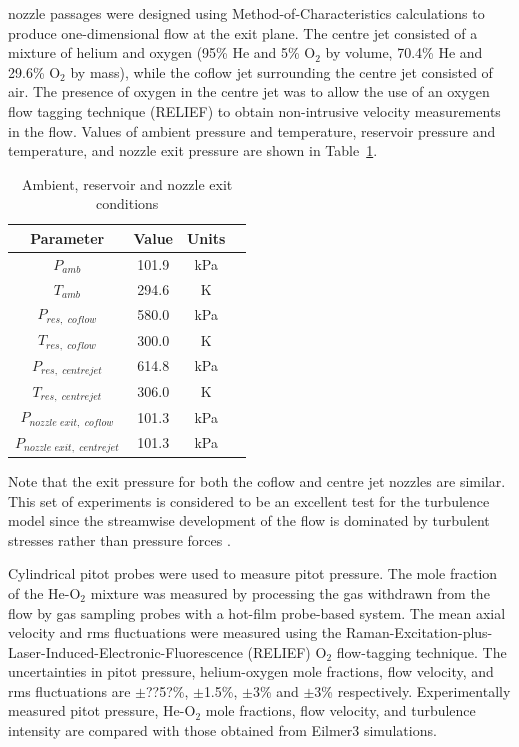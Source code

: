 %
nozzle passages were designed using Method-of-Characteristics calculations to 
produce one-dimensional flow at the exit plane. The centre jet
consisted of a mixture of helium and oxygen (95\% He and 5\% O$_2$ by
volume, 70.4\% He and 29.6\% O$_2$ by mass), while the coflow jet 
surrounding the centre jet consisted of air. The presence of oxygen 
in the centre jet was to allow the use of an oxygen flow tagging 
technique (RELIEF) to obtain non-intrusive velocity measurements 
in the flow. Values of ambient pressure and temperature, reservoir 
pressure and temperature, and nozzle exit pressure are shown in 
Table~\ref{given-conditions-coaxial-jet}. 
%
\begin{table}[h]
  \caption{Ambient, reservoir and nozzle exit conditions}
  \label{given-conditions-coaxial-jet}
  \begin{center}
    \begin{tabular}{cccl}
      \hline\hline
      Parameter & Value   & Units \\
      \hline
      $P_{amb}$             & 101.9   & kPa \\
      $T_{amb}$             & 294.6   & K   \\
      $P_{res, \,\, coflow}$     & 580.0   & kPa \\
      $T_{res, \,\, coflow}$     & 300.0   & K   \\
      $P_{res, \,\, centrejet}$  & 614.8   & kPa \\
      $T_{res, \,\, centrejet}$  & 306.0   & K   \\
      $P_{nozzle \,\, exit, \,\, coflow}$     & 101.3   & kPa \\
      $P_{nozzle \,\, exit, \,\, centrejet}$     & 101.3   & kPa \\
      \hline \hline
    \end{tabular}
  \end{center}
\end{table}
%
Note that the exit pressure for both the coflow and centre jet
nozzles are similar. This set of experiments is considered to be 
an excellent test for the turbulence model since the streamwise 
development of the flow is dominated by turbulent stresses rather 
than pressure forces \cite{Cutler2001}.

Cylindrical pitot probes were used to measure pitot pressure. 
The mole fraction of the He-O$_2$ mixture was measured by processing 
the gas withdrawn from the flow by gas sampling probes with a hot-film 
probe-based system. The mean axial velocity and rms fluctuations were 
measured using the Raman-Excitation-plus-Laser-Induced-Electronic-Fluorescence (RELIEF) 
O$_2$ flow-tagging technique. The uncertainties in pitot pressure, 
helium-oxygen mole fractions, flow velocity, and rms fluctuations are 
$\pm$??5?\%, $\pm$1.5\%, $\pm$3\% and $\pm$3\% respectively.
Experimentally measured pitot pressure, He-O$_2$ mole fractions,
flow velocity, and turbulence intensity are compared with those
obtained from Eilmer3 simulations.

